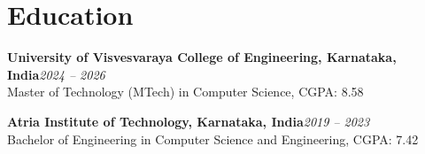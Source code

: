 \documentclass[10pt, a4paper]{article}
\newcommand{\eduheader}[3]{%
  \noindent\textbf{#1}\hfill\textit{#3}\\[-2pt]
  \hspace{1.5em}#2
}
\begin{document}
\section{Education}

\eduheader{University of Visvesvaraya College of Engineering, Karnataka, India}{Master of Technology (MTech) in Computer Science, CGPA: 8.58}{2024 -- 2026}

\vspace{6pt}

\eduheader{Atria Institute of Technology, Karnataka, India}{Bachelor of Engineering in Computer Science and Engineering, CGPA: 7.42}{2019 -- 2023}
\end{document}
